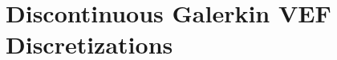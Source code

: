 \documentclass[../doc.tex]{subfiles}
\begin{document}
\chapter{Discontinuous Galerkin VEF Discretizations}
\end{document}

